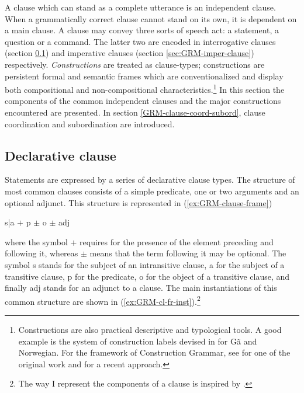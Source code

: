 A  clause which can stand as a complete utterance is
an independent clause. When a grammatically correct clause cannot stand on its
own, it is dependent on  a main clause.  A clause may convey three
sorts of speech act: a statement, a question or a command. The latter two are
encoded in interrogative clauses (section \ref{sec:GRM-interr-clause}) and
imperative clauses  (section \ref{sec:GRM-imper-clause}) respectively.  
{\it Constructions} are treated as clause-types; constructions are persistent
formal and
semantic frames which are conventionalized and display both compositional and
non-compositional characteristics.\footnote{Constructions are also practical
descriptive
and typological  tools. A good example is the system of construction labels
devised in \cite{Hell10} for Gã and Norwegian. For the framework of
Construction Grammar, see \cite{Fill88} for one of the original work and
\cite{Crof01} for a recent approach. } In this section  the components
of
the
common independent  clauses and the major constructions encountered are
presented.  In
section \ref{GRM-clause-coord-subord},  clause coordination and subordination 
are 
introduced. 


\subsection{Declarative clause}
\label{sec:GRM-interr-clause}

Statements are expressed by a series of declarative clause types. The structure
of most common clauses consists of  a simple predicate, one or two arguments and
an optional adjunct. This structure is represented in
(\ref{ex:GRM-clause-frame})


\begin{exe}
\ex\label{ex:GRM-clause-frame}
 {\sc s|a}  $+$ {\sc p} $\pm$ {\sc o} $\pm$ {\sc adj} 
\end{exe}

where the symbol $+$  requires for the presence of the element preceding
and following it,  whereas  $\pm$ means that the term following it may be
optional.
The
symbol {\sc s} stands for the subject of an intransitive clause,  {\sc a} 
for the subject of a transitive clause, {\sc p}  for the predicate,  {\sc
o}  for the object of a transitive clause, and finally {\sc adj}
stands for an adjunct to a clause. The main instantiations  of this common
structure are shown in  (\ref{ex:GRM-cl-fr-inst}).\footnote{The way I represent
the components of a clause is inspired by \citet[31]{Bonv88}.}


